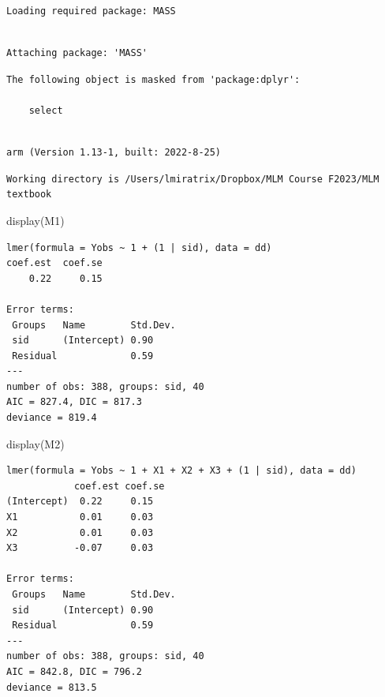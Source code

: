 \documentclass[
  letterpaper,
  DIV=11,
  numbers=noendperiod]{scrreprt}
\newenvironment{Shaded}{\begin{snugshade}}{\end{snugshade}}
\newcommand{\FunctionTok}[1]{\textcolor[rgb]{0.02,0.16,0.49}{#1}}
\newcommand{\NormalTok}[1]{\textcolor[rgb]{0.00,0.44,0.13}{#1}}
\begin{document}
\begin{verbatim}
Loading required package: MASS
\end{verbatim}

\begin{verbatim}

Attaching package: 'MASS'
\end{verbatim}

\begin{verbatim}
The following object is masked from 'package:dplyr':

    select
\end{verbatim}

\begin{verbatim}

arm (Version 1.13-1, built: 2022-8-25)
\end{verbatim}

\begin{verbatim}
Working directory is /Users/lmiratrix/Dropbox/MLM Course F2023/MLM textbook
\end{verbatim}

\begin{Shaded}
\begin{Highlighting}[]
\FunctionTok{display}\NormalTok{(M1)}
\end{Highlighting}
\end{Shaded}

\begin{verbatim}
lmer(formula = Yobs ~ 1 + (1 | sid), data = dd)
coef.est  coef.se 
    0.22     0.15 

Error terms:
 Groups   Name        Std.Dev.
 sid      (Intercept) 0.90    
 Residual             0.59    
---
number of obs: 388, groups: sid, 40
AIC = 827.4, DIC = 817.3
deviance = 819.4 
\end{verbatim}

\begin{Shaded}
\begin{Highlighting}[]
\FunctionTok{display}\NormalTok{(M2)}
\end{Highlighting}
\end{Shaded}

\begin{verbatim}
lmer(formula = Yobs ~ 1 + X1 + X2 + X3 + (1 | sid), data = dd)
            coef.est coef.se
(Intercept)  0.22     0.15  
X1           0.01     0.03  
X2           0.01     0.03  
X3          -0.07     0.03  

Error terms:
 Groups   Name        Std.Dev.
 sid      (Intercept) 0.90    
 Residual             0.59    
---
number of obs: 388, groups: sid, 40
AIC = 842.8, DIC = 796.2
deviance = 813.5 
\end{verbatim}
\end{document}
